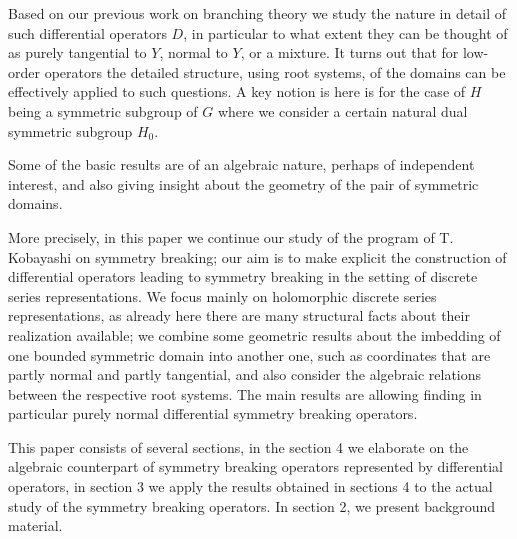 \documentclass[12pt]{amsart}
\theoremstyle{definition}
\theoremstyle{remark}
\numberwithin{equation}{section}
\begin{document}
Based on our previous work on branching theory we study the nature in detail of such differential operators $D$,
in particular to what extent they can be thought of as purely tangential  to $Y$, normal to $Y$, or a mixture.
It turns out that for low-order operators the detailed structure, using root systems, of the domains can
be effectively applied to such questions. A key notion is here is for the case of $H$ being  a symmetric subgroup
of $G$ where we consider a certain natural dual symmetric subgroup $H_0$.

Some of the basic results are of an algebraic nature, perhaps of independent interest, and also giving insight
about the geometry of the pair of symmetric domains.

 More precisely, in this paper we continue our study of the program of T. Kobayashi on symmetry breaking; our aim is to
make explicit the construction of differential operators leading to symmetry breaking in the
setting of discrete series representations. We focus mainly on holomorphic discrete series representations,
as already here there are many structural facts about their realization available; we combine some geometric
results about the imbedding of one bounded symmetric domain into another one, such as coordinates that
are partly normal and partly tangential, and also consider the algebraic relations between the respective root systems.
The main results are allowing finding in particular purely normal differential symmetry breaking operators.

This paper consists of several sections, in the   section 4 we elaborate on the algebraic counterpart of symmetry breaking operators represented by differential operators, in    section 3 we apply the results obtained in   sections 4 to the actual study of the symmetry breaking operators. In section 2, we present  background material.
\end{document}
